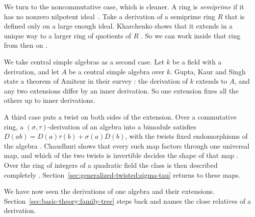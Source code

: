 We turn to the noncommutative case, which is cleaner. A ring is \emph{semiprime} if it has no
nonzero nilpotent ideal~\cite[Definition~1.1.1, p.~2]{Kharchenko1991}. Take a derivation of a semiprime ring $R$ that is
defined only on a large enough ideal. Kharchenko shows that it extends in a
unique way to a larger ring of quotients of $R$
\cite[Proposition~1.8.1, p.~50]{Kharchenko1991}. So we can work inside that ring
from then on \cite[\S1.8.2, p.~51]{Kharchenko1991}.

We take central simple algebras as a second case. Let $k$ be a field with a
derivation, and let $A$ be a central simple algebra over $k$. Gupta, Kaur and
Singh state a theorem of Amitsur in their survey
\cite[Theorem~3.1]{GuptaKaurSingh2023}: the derivation of $k$ extends to $A$, and
any two extensions differ by an inner derivation. So one extension fixes all the
others up to inner derivations.

A third case puts a twist on both sides of the extension. %
Over a commutative
ring, a $(\sigma,\tau)$-derivation of an algebra into a bimodule satisfies
$D(ab)=D(a)\tau(b)+\sigma(a)D(b)$, with the twists fixed endomorphisms of the
algebra \cite[p.~2]{Chaudhuri2020SigmaTau}. Chaudhuri shows that every such map
factors through one universal map, and which of the two twists is invertible
decides the shape of that map
\cite[Theorem~3.1, p.~3]{Chaudhuri2020SigmaTau}. Over the ring of integers of a
quadratic field the class is then described completely
\cite[Theorem~4.2, pp.~6--7]{Chaudhuri2020SigmaTau}.
Section~\ref{sec:generalized-twisted:sigma-tau} returns to these maps.

We have now seen the derivations of one algebra and their extensions.
Section~\ref{sec:basic-theory:family-tree} steps back and names the close
relatives of a derivation.
